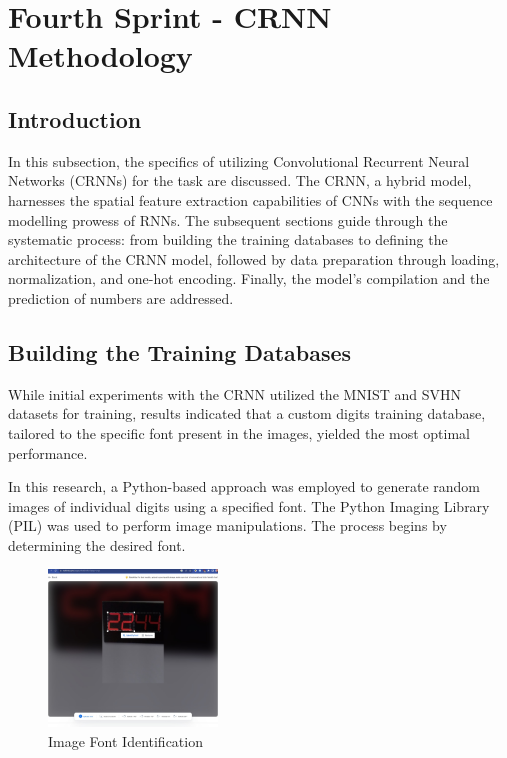 \newpage

\section{Fourth Sprint - CRNN Methodology}

\subsection{Introduction}

In this subsection, the specifics of utilizing Convolutional Recurrent Neural Networks (CRNNs) for the task are discussed. The CRNN, a hybrid model, harnesses the spatial feature extraction capabilities of CNNs with the sequence modelling prowess of RNNs. The subsequent sections guide through the systematic process: from building the training databases to defining the architecture of the CRNN model, followed by data preparation through loading, normalization, and one-hot encoding. Finally, the model's compilation and the prediction of numbers are addressed.


\subsection{Building the Training Databases}
While initial experiments with the CRNN utilized the MNIST \cite{MnistTensorFlowDatasets} and SVHN \cite{StreetViewHouse} datasets for training, results indicated that a custom digits training database, tailored to the specific font present in the images, yielded the most optimal performance.

In this research, a Python-based approach was employed to generate random images of individual digits using a specified font. The Python Imaging Library (PIL) was used to perform image manipulations. The process begins by determining the desired font.

\begin{figure}[ht]
    \centering
    \includegraphics[width=0.4\textwidth]{Figures/find_font/myfonts.jpg}
    \caption[Image Font Identification]{Image Font Identification}
    \label{fig:Image Font Identification}
\end{figure}


